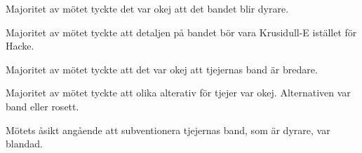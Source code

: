 \documentclass[10pt]{article}
\begin{document}
\begin{paragrafer}
Majoritet av mötet tyckte det var okej att det bandet blir dyrare. 

Majoritet av mötet tyckte att detaljen på bandet bör vara Krusidull-E istället för Hacke.

Majoritet av mötet tyckte att det var okej att tjejernas band är bredare. 

Majoritet av mötet tyckte att olika alterativ för tjejer var okej. Alternativen var band eller rosett.

Mötets åsikt angående att subventionera tjejernas band, som är dyrare, var blandad. 

\begin{comment}
Adam undrade vad priset lanande på. Henrik svarade att det landade på cirka 160kr. Henrik drog ner antalet färgband för att få ner priset.
Sophia undrade om tjejernas band får plats med medaljer. Sophia kår sa att det går bra. 

Tove - detalj pris vs detalj med Hacke eller bredare bandet.
THeo - kommentar ang vit väst. Det försvinner lite för killarna iom att vi har vit väst. 

Joakim - Ett till färgförslag. 
Filip tycker att det gamla bandet är snyggare. 5 färger är snyggt och cleant. Inga åsikter till tjejerna men förstår att det inte är lika bra. 
Edvard - tycker det gamla bandet är klart snyggare och fölkjet tlth standard -- naturligt att det blir dyrare men viktigare att det är enhetligt och att vi kan få samhörighet och poäng aatt ha likadana ordensband för tjejr och killar.
Stpeh - Najs om vi har samma. Men tycker att vi ska ha svart-vit-svart. För att det ser snyggare ut. -> Tjockare band är snyggare. Vill gärna att vi ocskå har en detalj. Tycker det gamla har varit kasst och tycker det ska bli kul att byta. Värt kostnadet. 

Matilda- smalare är bättre och kul att vi kan ändra. Rosett är inte lika fint. 

Saga lyfte frågan om rosett vs band + rosett. 

Love frågade om TLThs standard för ordensband och frackband. Pontus svarade att det breda vbandet är ordensband och den smala är frackkavaj.

Matilda tyckteen ide att sektionen ska subventionera tjejbandet eftersom det är dyrare men att det är vikigt att det är enhetligt. 
Sophia tyckte att det smalare för killar 

Ester tycker om det gamla för killarna. vill själv ha ett långt band men vill inte fästa det i sin klänning då det blir märken. Tror inte det ser fullt ut att någon har rosett och om någon har band.
Davida Stor vinst är att slippa sätta nålar i kläningen.
Filip - sammantattning. Konsensus är att vi tycker det gamla bandet på killar men samma på tjejer fast bredare. 
Sophia - Har inte data en tjockare för tjejer? Matilda svarade att de ha två olika tjocklekar. 
Adam - Går att fixa glattare band med samma mönster. Tycker inte att diskussionen ger något mer nu. 


\end{comment}
\end{paragrafer}
\end{document}
